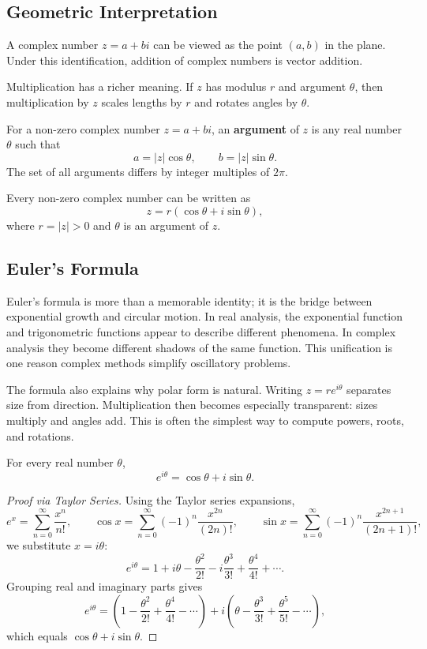 \subsection{Geometric Interpretation}

A complex number $z=a+bi$ can be viewed as the point $(a,b)$ in the plane. Under this identification, addition of complex numbers is vector addition.

Multiplication has a richer meaning. If $z$ has modulus $r$ and argument $\theta$, then multiplication by $z$ scales lengths by $r$ and rotates angles by $\theta$.

\begin{definition}[Argument]
For a non-zero complex number $z=a+bi$, an \textbf{argument} of $z$ is any real number $\theta$ such that
\[
    a=|z|\cos\theta,
    \qquad
    b=|z|\sin\theta.
\]
The set of all arguments differs by integer multiples of $2\pi$.
\end{definition}

\begin{definition}
Every non-zero complex number can be written as
\[
    z=r(\cos\theta+i\sin\theta),
\]
where $r=|z|>0$ and $\theta$ is an argument of $z$.
\end{definition}

\subsection{Euler's Formula}


Euler's formula is more than a memorable identity; it is the bridge between exponential growth and circular motion. In real analysis, the exponential function and trigonometric functions appear to describe different phenomena. In complex analysis they become different shadows of the same function. This unification is one reason complex methods simplify oscillatory problems.

The formula also explains why polar form is natural. Writing $z=re^{i\theta}$ separates size from direction. Multiplication then becomes especially transparent: sizes multiply and angles add. This is often the simplest way to compute powers, roots, and rotations.

\begin{theorem}
For every real number $\theta$,
\[
    e^{i\theta}=\cos\theta+i\sin\theta.
\]
\end{theorem}

\begin{proof}[Proof via Taylor Series]
Using the Taylor series expansions,
\[
    e^x=\sum_{n=0}^{\infty}\frac{x^n}{n!},
    \qquad
    \cos x=\sum_{n=0}^{\infty}(-1)^n\frac{x^{2n}}{(2n)!},
    \qquad
    \sin x=\sum_{n=0}^{\infty}(-1)^n\frac{x^{2n+1}}{(2n+1)!},
\]
we substitute $x=i\theta$:
\[
    e^{i\theta}=1+i\theta-\frac{\theta^2}{2!}-i\frac{\theta^3}{3!}+\frac{\theta^4}{4!}+\cdots.
\]
Grouping real and imaginary parts gives
\[
    e^{i\theta}=\left(1-\frac{\theta^2}{2!}+\frac{\theta^4}{4!}-\cdots\right)
    +i\left(\theta-\frac{\theta^3}{3!}+\frac{\theta^5}{5!}-\cdots\right),
\]
which equals $\cos\theta+i\sin\theta$.
\end{proof}

